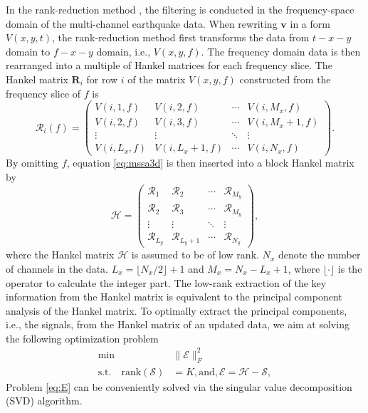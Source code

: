 In the rank-reduction method \cite{mssa}, the filtering is conducted in the frequency-space domain of the multi-channel earthquake data. When rewriting $\mathbf{v}$ in a  form $V(x,y,t)$, the rank-reduction method first transforms the data from $t-x-y$ domain to $f-x-y$ domain, i.e., $V(x,y,f)$. The frequency domain data is then rearranged into a multiple of  Hankel matrices for each frequency slice. The Hankel matrix $\mathbf{R}_i$ for row $i$ of the matrix $V(x,y,f)$ constructed from the frequency slice of $f$ is
\begin{equation}
\label{eq:mssa3d}
\mathcal{R}_i(f)=\left(\begin{array}{cccc}
V(i,1,f) & V(i,2,f) & \cdots &V(i,M_x,f) \\
V(i,2,f) & V(i,3,f)  &\cdots &V(i,M_x+1,f) \\
\vdots & \vdots &\ddots &\vdots \\
V(i,L_x,f)&V(i,L_x+1,f) &\cdots&V(i,N_x,f)
\end{array}
\right).
\end{equation}
By omitting $f$, equation \ref{eq:mssa3d} is then inserted into a block Hankel matrix by
\begin{equation}
\label{eq:mssa3d2}
\mathcal{H}=\left(\begin{array}{cccc}
\mathcal{R}_1 & \mathcal{R}_2 & \cdots &\mathcal{R}_{M_y}\\
\mathcal{R}_2 & \mathcal{R}_3  &\cdots &\mathcal{R}_{M_y}\\
\vdots & \vdots &\ddots &\vdots \\
\mathcal{R}_{L_y} &\mathcal{R}_{L_y+1} &\cdots&\mathcal{R}_{N_y}
\end{array}
\right),
\end{equation}
where the Hankel matrix $\mathcal{H}$ is assumed to be of low rank. $N_x$  denote the number of channels in the data. $L_x=\lfloor N_x/2 \rfloor+1$ and $M_x=N_x-L_x+1$, where $\lfloor \cdot \rfloor$ is the operator to calculate the integer part.  The low-rank extraction of the key information from the Hankel matrix is equivalent to the principal component analysis of the Hankel matrix. To optimally extract the principal components, i.e., the signals, from the Hankel matrix of an updated data, we aim at solving the following optimization problem
\begin{equation}
\label{eq:E}
\begin{split}
\min &\parallel \mathcal{E} \parallel_F^2 \\
\text{s.t.} \quad \text{rank}(\mathcal{S}) & =K, \text{and}, \mathcal{E}=\mathcal{H}-\mathcal{S},
\end{split}
\end{equation}
Problem \ref{eq:E} can be conveniently solved via the singular value decomposition (SVD) algorithm. 

